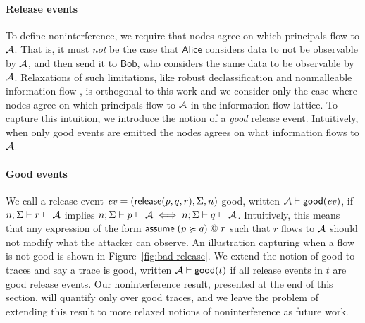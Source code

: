 \paragraph{Release events}\label{sec:release-events}
To define noninterference, we require that nodes agree on which principals flow to $\mathcal{A}$. That is, it must \emph{not} be the case that $\mathsf{Alice}$ considers data to not be observable by $\mathcal{A}$, and then send it to $\mathsf{Bob}$, who considers the same data to be observable by $\mathcal{A}$. Relaxations of such limitations, like robust declassification \cite{Zdancewic:2001:RD:872752.873524, Myers:2004:ERD:1009380.1009673} and nonmalleable information-flow \cite{Cecchetti:2017:NIF:3133956.3134054}, is orthogonal to this work and we consider only the case where nodes agree on which principals flow to $\mathcal{A}$ in the information-flow lattice. To capture this intuition, we introduce the notion of a \emph{good} release event. Intuitively, when only good events are emitted the nodes agrees on what information flows to $\mathcal{A}$.

\paragraph{Good events}
We call a release event $\mathit{ev} = (\mathsf{release}(p, q, r), \Sigma, n)$ good, written $\mathcal{A} \vdash \mathsf{good}(\mathit{ev})$, if $n; \Sigma \vdash r \sqsubseteq \mathcal{A}$ implies $n; \Sigma \vdash p \sqsubseteq \mathcal{A} \iff n; \Sigma \vdash q \sqsubseteq \mathcal{A}$. Intuitively, this means that any expression of the form $\mathsf{assume}\;(p \succcurlyeq q) \;@ \; r$ such that $r$ flows to $\mathcal{A}$ should not modify what the attacker can observe. An illustration capturing when a flow is not good is shown in Figure~\ref{fig:bad-release}. We extend the notion of good to traces and say a trace is good, written $\mathcal{A} \vdash \mathsf{good}(t)$ if all release events in $t$ are good release events. Our noninterference result, presented at the end of this section, will quantify only over good traces, and we leave the problem of extending this result to more relaxed notions of noninterference as future work.

